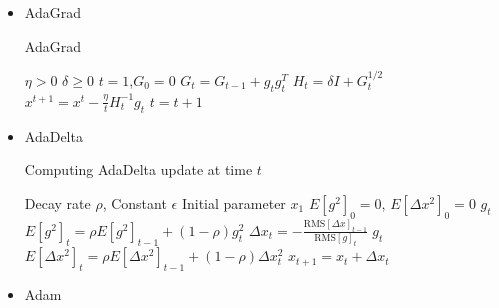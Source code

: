\documentclass{article}
\begin{document}
\begin{itemize}
        \item AdaGrad

        \begin{algorithm}[H]
            \caption{AdaGrad}
            \begin{algorithmic}[1]
                \Require  $\eta>0$ $\delta \geq 0$
                \State  $t=1$,$G_{0}=0$
                    \State $G_t = G_{t-1}+ g_t g_t^T$
                    \State $H_t = \delta I + G_t^{1/2}$
                    \State $x^{t+1} = x^t - \frac{\eta}{t} H_t^{-1} g_t$
                    \State $t=t+1$
                \EndWhile
            \end{algorithmic}
        \end{algorithm}


        \item AdaDelta

        \begin{algorithm}[H]
            \caption{Computing AdaDelta update at time $t$}
            \begin{algorithmic}[1]
                \Require Decay rate $\rho$, Constant $\epsilon$
                \Require Initial parameter $x_1$
                \State $E[g^2]_0 = 0$, $E[\Delta x^2]_0 = 0$ 
                    \State $g_t$ 
                    \State $E[g^2]_t = \rho E[g^2]_{t-1} + (1-\rho) g_t^2$ 
                    \State $\Delta x_t = - \frac{\text{RMS}[\Delta x]_{t-1}}{\text{RMS}[g]_t} \; g_t$ 
                    \State $E[\Delta x^2]_t = \rho E[\Delta x^2]_{t-1} + (1-\rho) \Delta x_t^2$ 
                    \State $x_{t+1} = x_t + \Delta x_t$ 
                \EndFor
            \end{algorithmic}
        \end{algorithm}

        \item Adam


\end{itemize}
\end{document}
